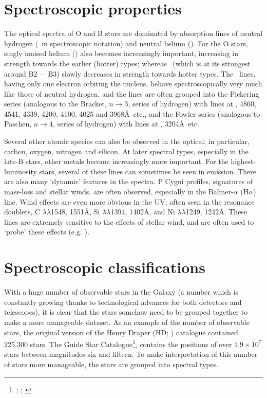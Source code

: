 \section{Spectroscopic properties}

The optical spectra of O and B stars are dominated by absorption lines
of neutral hydrogen (\hi\ in spectroscopic notation) and neutral
helium (\hei). For the O stars, singly ionised helium (\heii)
also becomes increasingly important, increasing in strength towards
the earlier (hotter) types; whereas \hei\ (which is at its strongest
around B2~--~B3) slowly decreases in strength towards hotter types. The
\heii\ lines, having only one electron orbiting the nucleus, behave
spectroscopically very much like those of neutral hydrogen, and the
lines are often grouped into the Pickering series (analogous to the
Bracket, $n \rightarrow 3$, series of hydrogen) with lines at
\lam{}, 4860, 4541, 4339, 4200, 4100, 4025 and 3968\AA\ etc.,
and the Fowler series (analogous to Paschen, $n \rightarrow 4$, series
of hydrogen) with lines at \lam{}, 3204\AA\ etc.

Several other atomic species can also be observed in the optical; in
particular, carbon, oxygen, nitrogen and silicon. At later spectral
types, especially in the late-B stars, other metals become
increasingly more important. For the highest-luminosity stars, several
of these lines can sometimes be seen in emission. There are also many
`dynamic' features in the spectra. P Cygni profiles, signatures of
mass-loss and stellar winds, are often observed, especially in the
Balmer-$\alpha$ (H$\alpha$) line. Wind effects are even more
obvious in the UV, often seen in the resonance doublets, C
$\lambda\lambda$1548, 1551\AA, Si $\lambda\lambda$1394,
1402\AA, and Ni $\lambda\lambda$1249, 1242\AA. These lines are
extremely sensitive to the effects of stellar wind, and are often used
to `probe' these effects (e.g. \cite{ho:winds}).


\section{Spectroscopic classifications}

With a huge number of observable stars in the Galaxy (a number which
is constantly growing thanks to technological advances for both detectors
and telescopes), it is clear that the stars somehow need to be grouped
together to make a more manageable dataset. As an example of the
number of observable stars, the original version of the Henry Draper
(HD; \cite{hdcat}) catalogue contained 225,300 stars. The Guide Star
Catalogue\footnote{\cite{1990AJ.....99.2019L}; \cite{1990AJ.....99.2059R};
\cite{1990AJ.....99.2082J}}, contains the positions of
over $1.9\times10^7$ stars between magnitudes six and fifteen. To make
interpretation of this number of stars more manageable, the stars are
grouped into spectral types.


